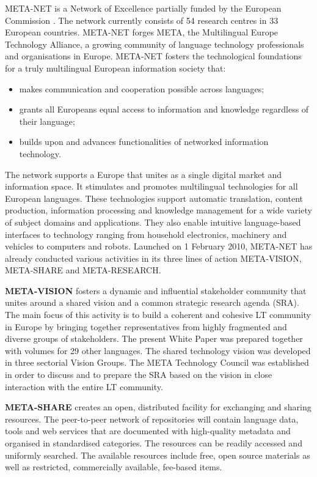 \begin{multicols}{2}
META-NET is a Network of Excellence partially funded by the European
Commission \cite{rehm2011}. The network currently consists of 54 research centres in 33 European countries. META-NET forges META, the Multilingual Europe Technology Alliance, a growing community of language technology professionals and organisations in Europe. META-NET fosters the technological foundations for a truly multilingual European information society that: 

\begin{itemize}
\item makes communication and cooperation possible across languages;
\item grants all Europeans equal access to information and knowledge regardless of their language; 
\item builds upon and advances functionalities of networked information technology.
\end{itemize}

The network supports a Europe that unites as a single digital market
and information space. It stimulates and promotes multilingual
technologies for all European languages. These technologies support
automatic translation, content production, information processing and
knowledge management for a wide variety of subject domains and
applications. They also enable intuitive language-based interfaces to
technology ranging from household electronics, machinery and vehicles
to computers and robots. Launched on 1 February 2010, META-NET has already conducted various activities in its three lines of action META-VISION, META-SHARE and META-RESEARCH. 

\textbf{META-VISION} fosters a dynamic and inﬂuential stakeholder community that unites around a shared vision and a common strategic research agenda (SRA). The main focus of this activity is to build a coherent and cohesive LT community in Europe by bringing together representatives from highly fragmented and diverse groups of stakeholders. The present White Paper was prepared together with volumes for 29 other languages. The shared technology vision was developed in three sectorial Vision Groups. The META Technology Council was established in order to discuss and to prepare the SRA based on the vision in close interaction with the entire LT community. 

\textbf{META-SHARE} creates an open, distributed facility for exchanging and sharing resources. The peer-to-peer network of repositories will contain language data, tools and web services that are documented with high-quality metadata and organised in standardised categories. The resources can be readily accessed and uniformly searched. The available resources include free, open source materials as well as restricted, commercially available, fee-based items. 


\end{multicols}

